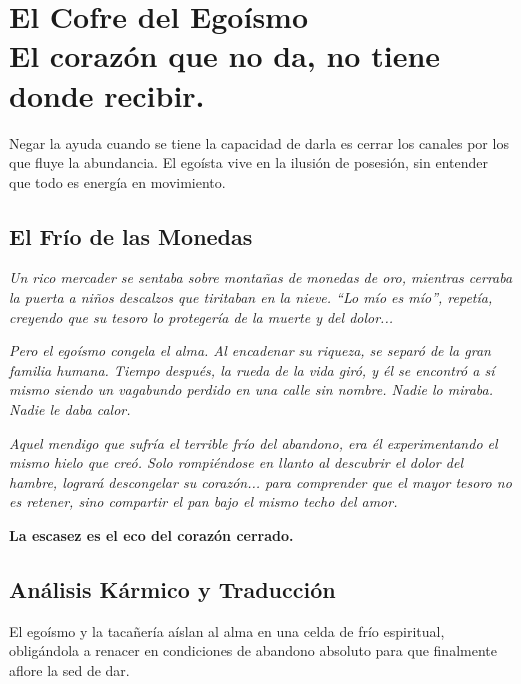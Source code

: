 \chapter[El Cofre del Egoísmo]{El Cofre del Egoísmo\\ \large El corazón que no da, no tiene donde recibir.}


\lettrine[lines=3, nindent=0.5em, findent=0.2em]{N}{}egar la ayuda cuando se tiene la capacidad de darla es cerrar los canales por los que fluye la abundancia. El egoísta vive en la ilusión de posesión, sin entender que todo es energía en movimiento.

\section{El Frío de las Monedas}
\begin{elegantquote}
\textit{Un rico mercader se sentaba sobre montañas de monedas de oro, mientras cerraba la puerta a niños descalzos que tiritaban en la nieve. ``Lo mío es mío'', repetía, creyendo que su tesoro lo protegería de la muerte y del dolor...}

\textit{Pero el egoísmo congela el alma. Al encadenar su riqueza, se separó de la gran familia humana. Tiempo después, la rueda de la vida giró, y él se encontró a sí mismo siendo un vagabundo perdido en una calle sin nombre. Nadie lo miraba. Nadie le daba calor.}

\textit{Aquel mendigo que sufría el terrible frío del abandono, era él experimentando el mismo hielo que creó. Solo rompiéndose en llanto al descubrir el dolor del hambre, logrará descongelar su corazón... para comprender que el mayor tesoro no es retener, sino compartir el pan bajo el mismo techo del amor.}

\end{elegantquote}

\vspace{1em}
\begin{center}
    \textbf{\Large La escasez es el eco del corazón cerrado.}
\end{center}
\vspace{1em}

\section{Análisis Kármico y Traducción}
\begin{figure}
  \vspace{-1.5em}
  \begin{center}
  \end{center}
  \vspace{-1.5em}
\end{figure}
El egoísmo y la tacañería aíslan al alma en una celda de frío espiritual, obligándola a renacer en condiciones de abandono absoluto para que finalmente aflore la sed de dar.

